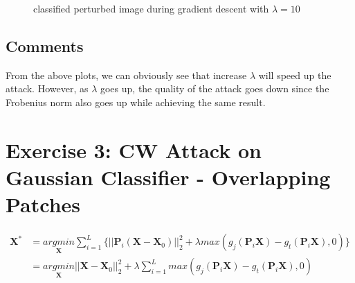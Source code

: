 \documentclass[11pt]{article}
\begin{document}
\pagebreak
\begin{figure}[h]
	\centering
	\caption{classified perturbed image during gradient descent with $\lambda = 10$}
\end{figure}

\subsection*{Comments}
From the above plots, we can obviously see that increase $\lambda$ will speed up the attack. However, as $\lambda$ goes up, the quality of the attack goes down since the Frobenius norm also goes up while achieving the same result.
\pagebreak
\section*{Exercise 3: CW Attack on Gaussian Classifier - Overlapping Patches}
\begin{equation}
\begin{split}
\pmb{X}^*&=\underset{\pmb{X}}{argmin}\sum_{i=1}^{L}\{||\pmb{P}_i(\pmb{X}-\pmb{X}_0)||^2_2+\lambda max(g_j(\pmb{P}_i\pmb{X})-g_t(\pmb{P}_i\pmb{X}),0)\}\\
&=\underset{\pmb{X}}{argmin}||\pmb{X}-\pmb{X}_0||^2_2+\lambda\sum_{i=1}^{L}max(g_j(\pmb{P}_i\pmb{X})-g_t(\pmb{P}_i\pmb{X}),0)
\end{split}
\end{equation}
\end{document}
